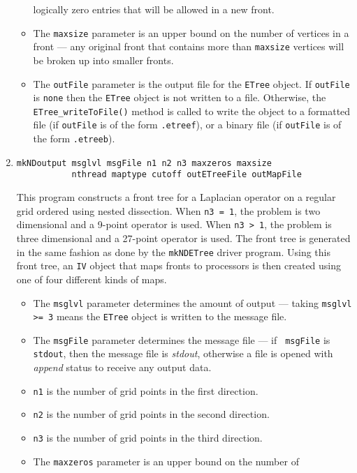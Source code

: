 \begin{enumerate}
\begin{itemize}
logically zero entries that will be allowed in a new front.
\item
The {\tt maxsize} parameter is an upper bound on the number of
vertices in a front --- any original front that contains more than
{\tt maxsize} vertices will be broken up into smaller fronts.
\item
The {\tt outFile} parameter is the output file for the {\tt ETree}
object. 
If {\tt outFile} is {\tt none} then the {\tt ETree} object is not
written to a file. 
Otherwise, the {\tt ETree\_writeToFile()} method is called to write
the object to a formatted file (if {\tt outFile} 
is of the form {\tt *.etreef}), or a binary file 
(if {\tt outFile} is of the form {\tt *.etreeb}).
\end{itemize}
\item
\begin{verbatim}
mkNDoutput msglvl msgFile n1 n2 n3 maxzeros maxsize 
           nthread maptype cutoff outETreeFile outMapFile
\end{verbatim}
\par
This program constructs a front tree for a Laplacian operator on a
regular grid ordered using nested dissection.
When {\tt n3 = 1}, the problem is two dimensional and a 9-point
operator is used.
When {\tt n3 > 1}, the problem is three dimensional and a 27-point
operator is used.
The front tree is generated in the same fashion as done by the 
{\tt mkNDETree} driver program.
Using this front tree, an {\tt IV} object that maps fronts 
to processors is then created using one of four different kinds of
maps.
\begin{itemize}
\item
The {\tt msglvl} parameter determines the amount of output ---
taking {\tt msglvl >= 3} means the {\tt ETree} object is written
to the message file.
\item
The {\tt msgFile} parameter determines the message file --- if {\tt
msgFile} is {\tt stdout}, then the message file is {\it stdout},
otherwise a file is opened with {\it append} status to receive any
output data.
\item
{\tt n1} is the number of grid points in the first direction.
\item
{\tt n2} is the number of grid points in the second direction.
\item
{\tt n3} is the number of grid points in the third direction.
\item
The {\tt maxzeros} parameter is an upper bound on the number of

\end{itemize}
\end{enumerate}
